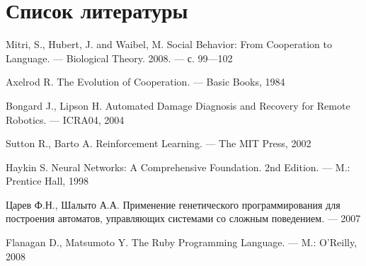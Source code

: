 \documentclass[a4paper,14pt]{extarticle}
\begin{document}
\newpage
\section{Список литературы}

\renewcommand*{\refname}{}
\begin{thebibliography}{}

    Mitri, S., Hubert, J. and Waibel, M. Social Behavior: From Cooperation to
    Language. — Biological Theory. 2008. — с. 99—102

    Axelrod R. The Evolution of Cooperation. — Basic Books, 1984

    Bongard J., Lipson H. Automated Damage Diagnosis and Recovery for Remote
    Robotics. — ICRA04, 2004

    Sutton R., Barto A. Reinforcement Learning. — The MIT Press, 2002

    Haykin S. Neural Networks: A Comprehensive Foundation. 2nd Edition. — M.: Prentice Hall, 1998

    Царев Ф.Н., Шалыто А.А. Применение генетического программирования для
    построения автоматов, управляющих системами со сложным поведением. — 2007
  
      Flanagan D., Matsumoto Y. The Ruby Programming Language. — M.: O'Reilly, 2008

\end{thebibliography}
\end{document}
